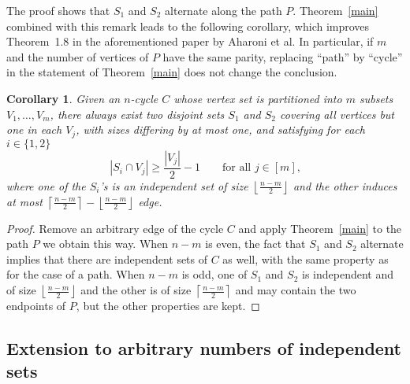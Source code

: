 \documentclass[12pt]{amsart}
\newtheorem{corollary}{Corollary}
\theoremstyle{remark}
\def\red{\color{red}}
\begin{document}
The proof shows that $S_1$ and $S_2$ alternate along the path $P$. Theorem~\ref{main} combined with this remark leads to the following corollary, 
which improves Theorem~1.8 in the aforementioned paper by Aharoni et al. 
In particular, if $m$ and the number of vertices of $P$ have the same parity, replacing ``path'' by ``cycle'' in the statement of Theorem~\ref{main} does not change the conclusion.

\begin{corollary}\label{cor}
Given an $n$-cycle $C$ whose vertex set is partitioned into $m$ subsets $V_1,\ldots,V_m$, there always exist two disjoint sets $S_1$ and $S_2$ covering all vertices but one in each $V_j$, with sizes differing by at most one, and satisfying for each $i\in\{1,2\}$
$$ |S_i\cap V_j| \geq  \frac{|V_j|} 2 -1\qquad\mbox{for all $j\in[m]$,}$$
where one of the $S_i$'s is an independent set of size $\left\lfloor \frac{n-m} 2\right\rfloor$ and the other induces at most $\left\lceil \frac{n-m} 2\right\rceil- \left\lfloor \frac{n-m} 2\right\rfloor$ edge. 
\end{corollary}


\begin{proof}
Remove an arbitrary edge of the cycle $C$ and apply Theorem~\ref{main} to the path $P$ we obtain this way. When $n-m$ is even, the fact that $S_1$ and $S_2$ alternate implies that there are independent sets of $C$ as well, with the same property as for the case of a path. When $n-m$ is odd, one of $S_1$ and $S_2$ is independent and of size $\left\lfloor\frac{n-m} 2\right\rfloor$ and the other is of size $\left\lceil \frac{n-m} 2\right\rceil$ and may contain the two endpoints of $P$, but the other properties are kept.
\end{proof}






\subsection{Extension to arbitrary numbers of independent sets}
\end{document}

